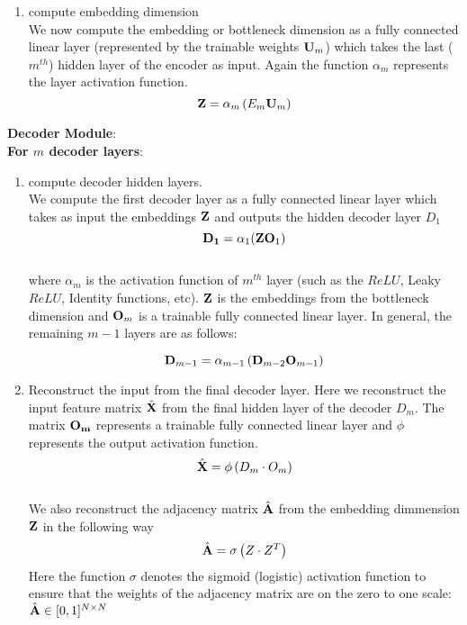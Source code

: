 \documentclass[a4paper,12pt]{article}
\newcommand{\forceindent}{\leavevmode{\parindent=2em\indent}}
\begin{document}
\begin{itemize}
\begin{enumerate}
{\begin{enumerate}
				\item[]{compute embedding dimension \\
					We now compute the embedding or bottleneck dimension as a fully connected linear layer (represented by the trainable weights ${\bf U}_m$) which takes the last ($m^{th}$) hidden layer of the encoder as input. Again the function $\alpha_{m}$ represents the layer activation function.  
					\[ {\bf Z} = \alpha_{m}\left(E_{m}  {\bf U}_m\right) \]} 
			\end{enumerate}
			\forceindent \textbf{Decoder Module}: \\
			\forceindent \textbf{For $m$ decoder layers}:
			\begin{enumerate}
				\item[]{compute decoder hidden layers.\\
					We compute the first decoder layer as a fully connected linear layer which takes as input the embeddings $\bf Z$ and outputs the hidden decoder layer $D_1$ 
					\[ {\bf D_1} = \alpha_1({\bf ZO}_1)\]
					\\
					where $\alpha_m$ is the activation function of $m^{th}$ layer (such as the $ReLU$, Leaky $ReLU$, Identity functions, etc). $\bf Z$ is the embeddings from the bottleneck dimension and ${\bf O}_m$ is a trainable fully connected linear layer. In general, the remaining $m-1$ layers are as follows:
					
					\[{\bf D}_{m-1} = \alpha_{m-1}\left({\bf D}_{m-2}{\bf O}_{m-1}\right)\]}
				
				\item[]{Reconstruct the input from the final decoder layer. Here we reconstruct the input feature matrix $\hat{\bf X}$ from the final hidden layer of the decoder $D_m$. The matrix ${\bf O_m}$ represents a trainable fully connected linear layer and $\phi$ represents the output activation function. 
					\[\hat{\bf X} = \phi\left(D_m\cdot O_m\right)\]
					\\
					We also reconstruct the adjacency matrix $\hat{\bf A}$ from the embedding dimmension $\bf Z$ in the following way
					\[\hat{\bf A} = \sigma\left(Z\cdot Z^T\right) \]
					Here the function $\sigma$ denotes the sigmoid (logistic) activation function to ensure that the weights of the adjacency matrix are on the zero to one scale: $\hat{\bf A} \in [0,1]^{N\times N}$
				}
					

\end{enumerate}}
\end{enumerate}
\end{itemize}
\end{document}
